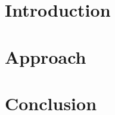 
\section{Introduction}
\label{sec:introduction}


\section{Approach}
\label{sec:approach}
	

\section{Conclusion}
\label{sec:conclusion}
